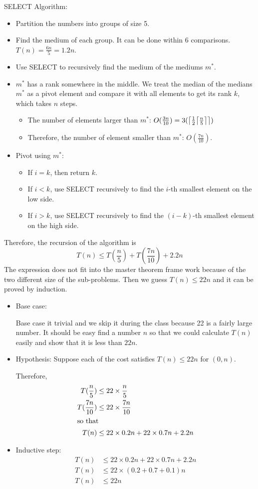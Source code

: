 SELECT Algorithm:
\begin{itemize}
	\item Partition the numbers into groups of size 5.
	\item Find the medium of each group. It can be done within 6 comparisons. $T(n) = \frac{6n}{5} 
	= 1.2n$.
	\item Use SELECT to recursively find the medium of the mediums $m^*$.
	\item $m^*$ has a rank somewhere in the middle.
	We treat the median of the medians $m^*$ as a pivot element and compare it with all elements to get its rank $k$, which takes $n$ steps.
	\begin{itemize}
		\item The number of elements larger than $m^*$: $O(\frac{3n}{10}) 
		=3(\ceil*{\frac{1}{2}\ceil*{\frac{n}{5}}})$
		\item Therefore, the number of element smaller than $m^*$: 
		$O(\frac{7n}{10})$.
	\end{itemize}
	\item Pivot using $m^*$:
	\begin{itemize}
		\item If $i = k$, then return $k$.
		\item If $i < k$, use SELECT recursively to find the $i$-th smallest 
		element on the low side.
		\item If $i > k$, use SELECT recursively to find the $(i-k)$-th smallest 
		element on the high side.
	\end{itemize}
\end{itemize}
Therefore, the recursion of the algorithm is
\[T(n) \le T(\frac{n}{5}) + T(\frac{7n}{10}) + 2.2n\]
The expression does not fit into the master theorem frame work because of the 
two different size of the sub-problems. Then we guess $T(n) \le 22n$ and it can 
be proved by induction.
\begin{itemize}
	\item Base case:
	
	Base case it trivial and we skip it during the class because 22 is a 
	fairly large number. It should be easy find a number $n$ so that we could 
	calculate $T(n)$ easily and show that it is less than $22n$.
	
	\item Hypothesis: Suppose each of the cost satisfies $T(n) \le 22n$ for $(0, 
	n)$. 
	
	Therefore, 
	\begin{align*}
	T(\frac{n}{5}) &\le 22 \times \frac{n}{5}\\
	T(\frac{7n}{10}) &\le 22 \times \frac{7n}{10}\\
	\intertext{so that}
	T(n) &\le 22 \times 0.2 n + 22 \times 0.7 n + 2.2n
	\end{align*}
	\item Inductive step:
	\begin{align*}
	T(n) &\le 22 \times 0.2 n + 22 \times 0.7 n + 2.2n\\
	T(n) &\le 22 \times (0.2 + 0.7 + 0.1)n\\
	T(n) &\le 22n
	\end{align*}
\end{itemize}

